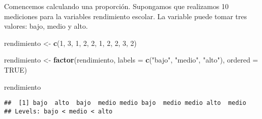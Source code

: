 \documentclass[spanish,]{book}
\newenvironment{Shaded}{\begin{snugshade}}{\end{snugshade}}
\newcommand{\KeywordTok}[1]{\textcolor[rgb]{0.13,0.29,0.53}{\textbf{#1}}}
\newcommand{\DataTypeTok}[1]{\textcolor[rgb]{0.13,0.29,0.53}{#1}}
\newcommand{\DecValTok}[1]{\textcolor[rgb]{0.00,0.00,0.81}{#1}}
\newcommand{\StringTok}[1]{\textcolor[rgb]{0.31,0.60,0.02}{#1}}
\newcommand{\OtherTok}[1]{\textcolor[rgb]{0.56,0.35,0.01}{#1}}
\newcommand{\NormalTok}[1]{#1}
\begin{document}
Comencemos calculando una proporción. Supongamos que realizamos 10
mediciones para la variables rendimiento escolar. La variable puede
tomar tres valores: bajo, medio y alto.

\begin{Shaded}
\begin{Highlighting}[]
\NormalTok{rendimiento <-}\StringTok{ }\KeywordTok{c}\NormalTok{(}\DecValTok{1}\NormalTok{, }\DecValTok{3}\NormalTok{, }\DecValTok{1}\NormalTok{, }\DecValTok{2}\NormalTok{, }\DecValTok{2}\NormalTok{, }\DecValTok{1}\NormalTok{, }\DecValTok{2}\NormalTok{, }\DecValTok{2}\NormalTok{, }\DecValTok{3}\NormalTok{, }\DecValTok{2}\NormalTok{)}

\NormalTok{rendimiento <-}\StringTok{ }\KeywordTok{factor}\NormalTok{(rendimiento,}
                      \DataTypeTok{labels =} \KeywordTok{c}\NormalTok{(}\StringTok{"bajo"}\NormalTok{, }\StringTok{"medio"}\NormalTok{, }\StringTok{"alto"}\NormalTok{),}
                      \DataTypeTok{ordered =} \OtherTok{TRUE}\NormalTok{)}

\NormalTok{rendimiento}
\end{Highlighting}
\end{Shaded}

\begin{verbatim}
##  [1] bajo  alto  bajo  medio medio bajo  medio medio alto  medio
## Levels: bajo < medio < alto
\end{verbatim}


\end{document}
